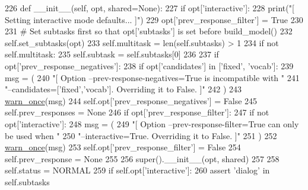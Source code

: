 \begin{DoxyCode}
226     \textcolor{keyword}{def }\_\_init\_\_(self, opt, shared=None):
227         \textcolor{keywordflow}{if} opt[\textcolor{stringliteral}{'interactive'}]:
228             print(\textcolor{stringliteral}{"[ Setting interactive mode defaults... ]"})
229             opt[\textcolor{stringliteral}{'prev\_response\_filter'}] = \textcolor{keyword}{True}
230 
231         \textcolor{comment}{# Set subtasks first so that opt['subtasks'] is set before build\_model()}
232         self.set\_subtasks(opt)
233         self.multitask = len(self.subtasks) > 1
234         \textcolor{keywordflow}{if} \textcolor{keywordflow}{not} self.multitask:
235             self.subtask = self.subtasks[0]
236 
237         \textcolor{keywordflow}{if} opt[\textcolor{stringliteral}{'prev\_response\_negatives'}]:
238             \textcolor{keywordflow}{if} opt[\textcolor{stringliteral}{'candidates'}] \textcolor{keywordflow}{in} [\textcolor{stringliteral}{'fixed'}, \textcolor{stringliteral}{'vocab'}]:
239                 msg = (
240                     \textcolor{stringliteral}{"[ Option --prev-response-negatives=True is incompatible with "}
241                     \textcolor{stringliteral}{"--candidates=['fixed','vocab']. Overriding it to False. ]"}
242                 )
243                 \hyperlink{namespaceparlai_1_1utils_1_1misc_acf146e70ea7f6867969a7c2b545d4b4b}{warn\_once}(msg)
244                 self.opt[\textcolor{stringliteral}{'prev\_response\_negatives'}] = \textcolor{keyword}{False}
245             self.prev\_responses = \textcolor{keywordtype}{None}
246         \textcolor{keywordflow}{if} opt[\textcolor{stringliteral}{'prev\_response\_filter'}]:
247             \textcolor{keywordflow}{if} \textcolor{keywordflow}{not} opt[\textcolor{stringliteral}{'interactive'}]:
248                 msg = (
249                     \textcolor{stringliteral}{"[ Option --prev-response-filter=True can only be used when "}
250                     \textcolor{stringliteral}{"--interactive=True. Overriding it to False. ]"}
251                 )
252                 \hyperlink{namespaceparlai_1_1utils_1_1misc_acf146e70ea7f6867969a7c2b545d4b4b}{warn\_once}(msg)
253                 self.opt[\textcolor{stringliteral}{'prev\_response\_filter'}] = \textcolor{keyword}{False}
254             self.prev\_response = \textcolor{keywordtype}{None}
255 
256         super().\_\_init\_\_(opt, shared)
257 
258         self.status = NORMAL
259         \textcolor{keywordflow}{if} self.opt[\textcolor{stringliteral}{'interactive'}]:
260             \textcolor{keyword}{assert} \textcolor{stringliteral}{'dialog'} \textcolor{keywordflow}{in} self.subtasks

\end{DoxyCode}
